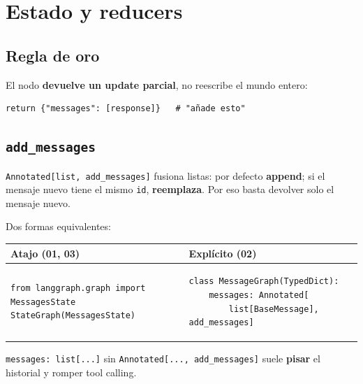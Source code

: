 \documentclass[11pt,a4paper]{article}
\begin{document}
\section{Estado y reducers}
\label{sec:state}

\subsection{Regla de oro}
El nodo \textbf{devuelve un update parcial}, no reescribe el mundo entero:

\begin{lstlisting}
return {"messages": [response]}   # "añade esto"
\end{lstlisting}

\subsection{\texttt{add\_messages}}
\begin{concept}[title=Reducer de chat]
\texttt{Annotated[list, add\_messages]} fusiona listas:
por defecto \textbf{append}; si el mensaje nuevo tiene el mismo \texttt{id}, \textbf{reemplaza}.
Por eso basta devolver solo el mensaje nuevo.
\end{concept}

Dos formas equivalentes:

\begin{center}
\begin{tabular}{@{}p{7.4cm}p{7.4cm}@{}}
\toprule
\textbf{Atajo (01, 03)} & \textbf{Explícito (02)} \\
\midrule
\begin{lstlisting}
from langgraph.graph import MessagesState
StateGraph(MessagesState)
\end{lstlisting}
&
\begin{lstlisting}
class MessageGraph(TypedDict):
    messages: Annotated[
        list[BaseMessage], add_messages]
\end{lstlisting}
\\
\bottomrule
\end{tabular}
\end{center}

\begin{warn}[title=Sin reducer = overwrite]
\texttt{messages: list[...]} sin \texttt{Annotated[..., add\_messages]}
suele \textbf{pisar} el historial y romper tool calling.
\end{warn}
\end{document}
